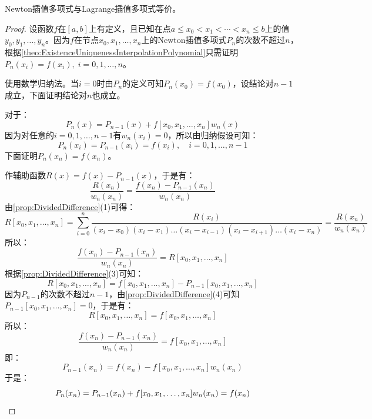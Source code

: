 \begin{property}\label{prop:NewtonInterpolationPolynomial}
	Newton插值多项式与Lagrange插值多项式等价。
\end{property}
\begin{proof}
	设函数$f$在$[a,b]$上有定义，且已知在点$a\leqslant x_0<x_1<\cdots<x_n\leqslant b$上的值$y_0,y_1,\dots,y_n$。因为$f$在节点$x_0,x_1,\dots,x_n$上的Newton插值多项式$P_n$的次数不超过$n$，根据\cref{theo:ExistenceUniquenessInterpolationPolynomial}只需证明$P_n(x_i)=f(x_i),\;i=0,1,\dots,n$。\par
	使用数学归纳法。当$i=0$时由$P_n$的定义可知$P_n(x_0)=f(x_0)$，设结论对$n-1$成立，下面证明结论对$n$也成立。\par
	对于：
	\begin{equation*}
		P_n(x)=P_{n-1}(x)+f[x_0,x_1,\dots,x_n]w_n(x)
	\end{equation*}
	因为对任意的$i=0,1,\dots,n-1$有$w_n(x_i)=0$，所以由归纳假设可知：
	\begin{equation*}
		P_n(x_i)=P_{n-1}(x_i)=f(x_i),\quad i=0,1,\dots,n-1
	\end{equation*}
	下面证明$P_n(x_n)=f(x_n)$。\par
	作辅助函数$R(x)=f(x)-P_{n-1}(x)$，于是有：
	\begin{equation*}
		\frac{R(x_n)}{w_n(x_n)}=\frac{f(x_n)-P_{n-1}(x_n)}{w_n(x_n)}
	\end{equation*}
	由\cref{prop:DividedDifference}(1)可得：
	\begin{equation*}
		R[x_0,x_1,\dots,x_n]=\sum_{i=0}^{n}\frac{R(x_i)}{(x_i-x_0)(x_i-x_1)\dots(x_i-x_{i-1})(x_i-x_{i+1})\dots(x_i-x_n)}=\frac{R(x_n)}{w_n(x_n)}
	\end{equation*}
	所以：
	\begin{equation*}
		\frac{f(x_n)-P_{n-1}(x_n)}{w_n(x_n)}=R[x_0,x_1,\dots,x_n]
	\end{equation*}
	根据\cref{prop:DividedDifference}(3)可知：
	\begin{equation*}
		R[x_0,x_1,\dots,x_n]=f[x_0,x_1,\dots,x_n]-P_{n-1}[x_0,x_1,\dots,x_n]
	\end{equation*}
	因为$P_{n-1}$的次数不超过$n-1$，由\cref{prop:DividedDifference}(4)可知$P_{n-1}[x_0,x_1,\dots,x_n]=0$，于是有：
	\begin{equation*}
		R[x_0,x_1,\dots,x_n]=f[x_0,x_1,\dots,x_n]
	\end{equation*}
	所以：
	\begin{equation*}
		\frac{f(x_n)-P_{n-1}(x_n)}{w_n(x_n)}=f[x_0,x_1,\dots,x_n]
	\end{equation*}
	即：
	\begin{equation*}
		P_{n-1}(x_n)=f(x_n)-f[x_0,x_1,\dots,x_n]w_n(x_n)
	\end{equation*}
	于是：
	\begin{equation*}
		P_n(x_n)=P_{n-1}(x_n)+f[x_0,x_1,\dots,x_n]w_n(x_n)=f(x_n)\qedhere
	\end{equation*}
\end{proof}
